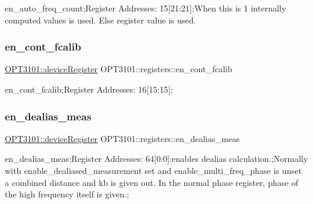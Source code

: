 en\+\_\+auto\+\_\+freq\+\_\+count;Register Addresses\+: 15\mbox{[}21\+:21\mbox{]};When this is \textquotesingle{}1\textquotesingle{} internally computed values is used. Else register value is used. 

\mbox{\label{class_o_p_t3101_1_1registers_aa138ff880edecfdc53ef83bf2cc0dcb8}} 
\subsubsection{\texorpdfstring{en\+\_\+cont\+\_\+fcalib}{en\_cont\_fcalib}}
{\footnotesize\ttfamily \mbox{\hyperlink{class_o_p_t3101_1_1device_register}{O\+P\+T3101\+::device\+Register}} O\+P\+T3101\+::registers\+::en\+\_\+cont\+\_\+fcalib}



en\+\_\+cont\+\_\+fcalib;Register Addresses\+: 16\mbox{[}15\+:15\mbox{]}; 

\mbox{\label{class_o_p_t3101_1_1registers_a0ada6bc0729541f5740281e93a12cc22}} 
\subsubsection{\texorpdfstring{en\+\_\+dealias\+\_\+meas}{en\_dealias\_meas}}
{\footnotesize\ttfamily \mbox{\hyperlink{class_o_p_t3101_1_1device_register}{O\+P\+T3101\+::device\+Register}} O\+P\+T3101\+::registers\+::en\+\_\+dealias\+\_\+meas}



en\+\_\+dealias\+\_\+meas;Register Addresses\+: 64\mbox{[}0\+:0\mbox{]};enables dealias calculation.;Normally with enable\+\_\+dealiased\+\_\+measurement set and enable\+\_\+multi\+\_\+freq\+\_\+phase is unset a combined distance and kb is given out. In the normal phase register, phase of the high frequency itself is given.; 

\mbox{\label{class_o_p_t3101_1_1registers_a78ff3c5f329d4fc1c2a716b84489e16b}} 
